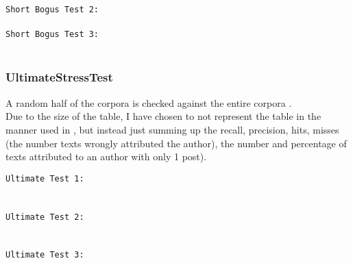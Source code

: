 \texttt{Short Bogus Test 2:}\\
\\

\texttt{Short Bogus Test 3:}\\
\\

\clearpage
\subsubsection{UltimateStressTest}
A random half of the corpora is checked against the entire corpora .\\
Due to the size of the table, I have chosen to not represent the table in the manner used in \cite{nr4}, but instead just summing up the recall, precision, hits, misses (the number texts wrongly attributed the author), the number and percentage of texts attributed to an author with only 1 post).

\texttt{Ultimate Test 1:}\\\\
\\

\clearpage
\texttt{Ultimate Test 2:}\\\\
\\

\clearpage
\texttt{Ultimate Test 3:}\\\\
\\
